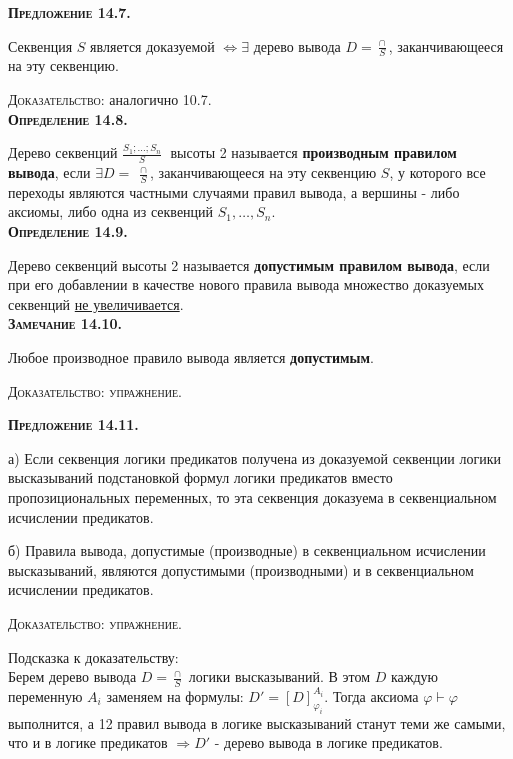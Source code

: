 \documentclass[18pt, a4paper]{extarticle}
\begin{document}
\textbf{\textsc{Предложение 14.7.}} 

Секвенция $S$ является доказуемой $\Leftrightarrow \exists$ дерево вывода $D = \displaystyle\frac{\cap}{S}$, заканчивающееся на эту секвенцию.

\textsc{Доказательство:} аналогично 10.7.\\

\textbf{\textsc{Определение 14.8.}} 

Дерево секвенций $\displaystyle \frac{S_1;\dots;S_n}{S}\;$ высоты 2 называется \textbf{производным правилом вывода}, если $\exists D =\;\displaystyle \frac{\cap}{S}$, заканчивающееся на эту секвенцию $S$, у которого все переходы являются частными случаями правил вывода, а вершины - либо аксиомы, либо одна из секвенций $S_1,\dots,S_n$.\\

\textbf{\textsc{Определение 14.9.}} 

Дерево секвенций высоты 2 называется \textbf{допустимым правилом вывода}, если при его добавлении в качестве нового правила вывода множество доказуемых секвенций \underline{не увеличивается}.\\

\textbf{\textsc{Замечание 14.10.}} 

Любое производное правило вывода является \textbf{допустимым}.

\textsc{Доказательство: упражнение.} \\

\newpage

\textbf{\textsc{Предложение 14.11.}} 

а) Если секвенция логики предикатов получена из доказуемой секвенции
логики высказываний подстановкой формул логики предикатов вместо
пропозициональных переменных, то эта секвенция доказуема в
секвенциальном исчислении предикатов.

б) Правила вывода, допустимые (производные) в секвенциальном
исчислении высказываний, являются допустимыми (производными) и в секвенциальном исчислении предикатов.

\textsc{Доказательство: упражнение.}

Подсказка к доказательству:\\
Берем дерево вывода $D=\displaystyle \frac{\cap}{S}$ логики высказываний. В этом $D$ каждую переменную $A_i$ заменяем на формулы: $D'=[D]^{A_i}_{\varphi_i}$. Тогда аксиома $\varphi\vdash\varphi$ выполнится, а 12 правил вывода в логике высказываний станут теми же самыми, что и в логике предикатов $\Rightarrow D'$ -  дерево вывода в логике предикатов.\\
\end{document}
